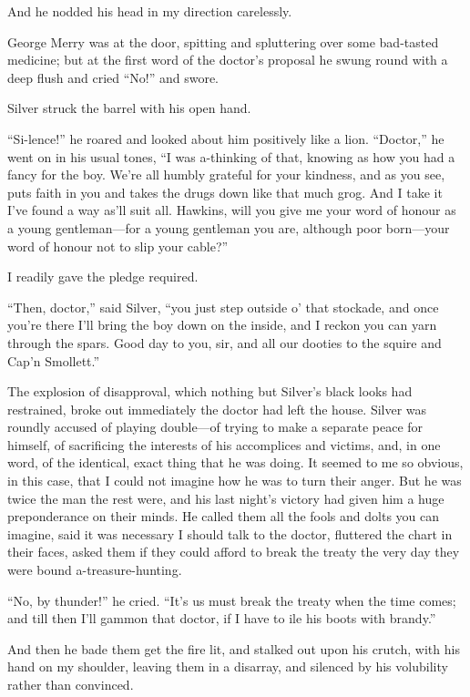 And he nodded his head in my direction carelessly.

George Merry was at the door, spitting and spluttering over some bad-tasted medicine; but at the first word of the doctor’s proposal he swung round with a deep flush and cried \enquote{No!} and swore.

Silver struck the barrel with his open hand.

\enquote{Si-lence!} he roared and looked about him positively like a lion. \enquote{Doctor,} he went on in his usual tones, \enquote{I was a-thinking of that, knowing as how you had a fancy for the boy. We’re all humbly grateful for your kindness, and as you see, puts faith in you and takes the drugs down like that much grog. And I take it I’ve found a way as’ll suit all. Hawkins, will you give me your word of honour as a young gentleman---for a young gentleman you are, although poor born---your word of honour not to slip your cable?}

I readily gave the pledge required.

\enquote{Then, doctor,} said Silver, \enquote{you just step outside o’ that stockade, and once you’re there I’ll bring the boy down on the inside, and I reckon you can yarn through the spars. Good day to you, sir, and all our dooties to the squire and Cap’n Smollett.}

The explosion of disapproval, which nothing but Silver’s black looks had restrained, broke out immediately the doctor had left the house. Silver was roundly accused of playing double---of trying to make a separate peace for himself, of sacrificing the interests of his accomplices and victims, and, in one word, of the identical, exact thing that he was doing. It seemed to me so obvious, in this case, that I could not imagine how he was to turn their anger. But he was twice the man the rest were, and his last night’s victory had given him a huge preponderance on their minds. He called them all the fools and dolts you can imagine, said it was necessary I should talk to the doctor, fluttered the chart in their faces, asked them if they could afford to break the treaty the very day they were bound a-treasure-hunting.

\enquote{No, by thunder!} he cried. \enquote{It’s us must break the treaty when the time comes; and till then I’ll gammon that doctor, if I have to ile his boots with brandy.}

And then he bade them get the fire lit, and stalked out upon his crutch, with his hand on my shoulder, leaving them in a disarray, and silenced by his volubility rather than convinced.

